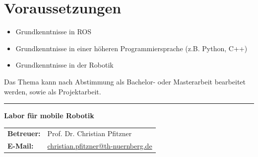 \documentclass[a4paper,11pt]{article}
\begin{document}
\section*{Voraussetzungen}
\begin{itemize}[leftmargin=0.5cm]
    \item Grundkenntnisse in ROS 
    \item Grundkenntnisse in einer höheren Programmiersprache (z.B. Python, C++)
    \item Grundkenntnisse in der Robotik
\end{itemize}

\vspace{0.5cm}
Das Thema kann nach Abstimmung als Bachelor- oder Masterarbeit bearbeitet werden, sowie als Projektarbeit. 


\vfill
\textcolor{ohm_red}{\rule{\linewidth}{0.4mm}}
\textbf{\textcolor{ohm_red}{Labor für mobile Robotik}} \\
\begin{tabular}{@{}ll}
\textbf{Betreuer:} & Prof. Dr. Christian Pfitzner \\
\textbf{E-Mail:}   & \href{mailto:christian.pfitzner@th-nuernberg.de}{christian.pfitzner@th-nuernberg.de} \\
\end{tabular}
\end{document}
